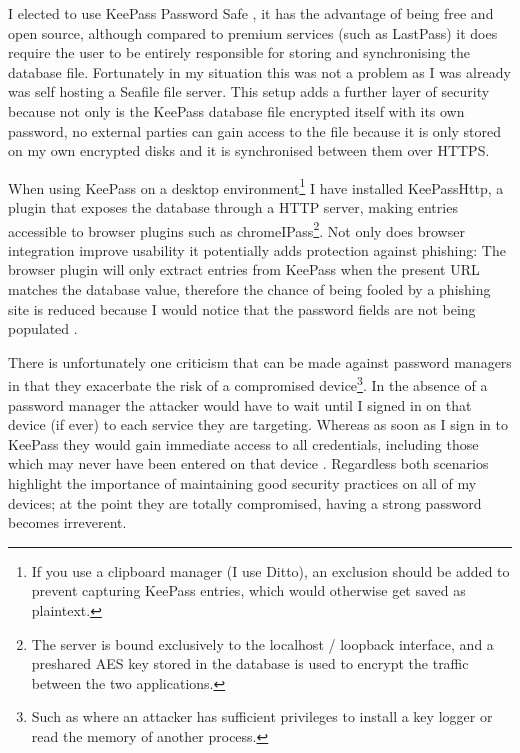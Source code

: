 \documentclass[11pt,a4paper]{scrartcl}
\begin{document}
\begin{refsection}
I elected to use KeePass Password Safe \cite{keepass}, it has the advantage of being free and open source, although compared to premium services (such as LastPass) it does require the user to be entirely responsible for storing and synchronising the database file. Fortunately in my situation this was not a problem as I was already was self hosting a Seafile file server. This setup adds a further layer of security because not only is the KeePass database file encrypted itself with its own password, no external parties can gain access to the file because it is only stored on my own encrypted disks and it is synchronised between them over HTTPS.

When using KeePass on a desktop environment\footnote{If you use a clipboard manager (I use Ditto), an exclusion should be added to prevent capturing KeePass entries, which would otherwise get saved as plaintext.} 
I have installed KeePassHttp, a plugin that exposes the database through a HTTP server, making entries accessible to browser plugins such as chromeIPass\footnote{The server is bound exclusively to the localhost / loopback interface, and a preshared AES key stored in the database is used to encrypt the traffic between the two applications.}. Not only does browser integration improve usability it  potentially adds protection against phishing: The browser plugin will only extract entries from KeePass when the present URL matches the database value, therefore the chance of being fooled by a phishing site is reduced because I would notice that the password fields are not being populated \cite{ncsc_pass_managers}.

There is unfortunately one criticism that can be made against password managers in that they exacerbate the risk of a compromised device\footnote{Such as where an attacker has sufficient privileges to install a key logger or read the memory of another process.}.
In the absence of a password manager the attacker would have to wait until I signed in on that device (if ever) to each service they are targeting. 
Whereas as soon as I sign in to KeePass they would gain immediate access to all credentials, including those which may never have been entered on that device \cite{citadel_keepass}. Regardless both scenarios highlight the importance of maintaining good security practices on all of my devices; at the point they are totally compromised, having a strong password becomes irreverent.

\printbibliography
\end{refsection}
\end{document}
